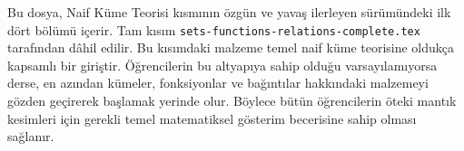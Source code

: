 \documentclass[../../include/open-logic-part]{subfiles}
\begin{document}
\begin{editorial}
  Bu dosya, Naif Küme Teorisi kısmının özgün ve yavaş ilerleyen sürümündeki
  ilk dört bölümü içerir. Tam kısım
  \verb|sets-functions-relations-complete.tex| tarafından dâhil edilir.
  Bu kısımdaki malzeme temel naif küme teorisine oldukça kapsamlı bir
  giriştir. Öğrencilerin bu altyapıya sahip olduğu varsayılamıyorsa derse,
  en azından kümeler, fonksiyonlar ve bağıntılar hakkındaki malzemeyi gözden
  geçirerek başlamak yerinde olur. Böylece bütün öğrencilerin öteki mantık
  kesimleri için gerekli temel matematiksel gösterim becerisine sahip olması
  sağlanır.
\end{editorial}
\OLEndPartHook
\end{document}
